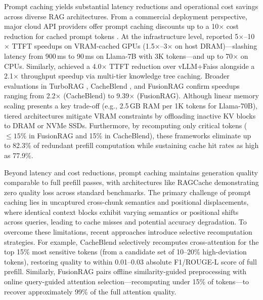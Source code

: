Prompt caching yields substantial latency reductions and operational cost savings across diverse RAG architectures. From a commercial deployment perspective, major cloud API providers offer prompt caching discounts up to a 10$\times$ cost reduction for cached prompt tokens \citep{GoogleVertexAIPricing}. At the infrastructure level, \citet{gim2024promptcache} reported 5$\times$--10$\times$ TTFT speedups on VRAM-cached GPUs (1.5$\times$--3$\times$ on host DRAM)—slashing latency from 900\,ms to 90\,ms on Llama-7B with 3K tokens—and up to 70$\times$ on CPUs. Similarly, \citet{jin2025ragcache} achieved a 4.0$\times$ TTFT reduction over vLLM+Faiss alongside a 2.1$\times$ throughput speedup via multi-tier knowledge tree caching. Broader evaluations in TurboRAG \citep{lu2025turborag}, CacheBlend \citep{yao2025cacheblend}, and FusionRAG \citep{wang2026fusionrag} confirm speedups ranging from 2.2$\times$ (CacheBlend) to 9.39$\times$ (FusionRAG). Although linear memory scaling presents a key trade-off (e.g., 2.5\,GB RAM per 1K tokens for Llama-70B), tiered architectures mitigate VRAM constraints by offloading inactive KV blocks to DRAM or NVMe SSDs. Furthermore, by recomputing only critical tokens ($\le 15\%$ in FusionRAG and 15\% in CacheBlend), these frameworks eliminate up to 82.3\% of redundant prefill computation while sustaining cache hit rates as high as 77.9\%.

Beyond latency and cost reductions, prompt caching maintains generation quality comparable to full prefill passes, with architectures like RAGCache \citep{jin2025ragcache} demonstrating zero quality loss across standard benchmarks. The primary challenge of prompt caching lies in uncaptured cross-chunk semantics and positional displacements, where identical context blocks exhibit varying semantics or positional shifts across queries, leading to cache misses and potential accuracy degradation. To overcome these limitations, recent approaches introduce selective recomputation strategies. For example, CacheBlend \citep{yao2025cacheblend} selectively recomputes cross-attention for the top 15\% most sensitive tokens (from a candidate set of 10--20\% high-deviation tokens), restoring quality to within 0.01--0.03 absolute F1/ROUGE-L score of full prefill. Similarly, FusionRAG \citep{wang2026fusionrag} pairs offline similarity-guided preprocessing with online query-guided attention selection—recomputing under 15\% of tokens—to recover approximately 99\% of the full attention quality.
